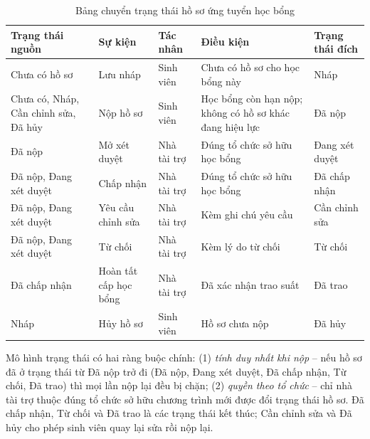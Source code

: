 \begin{table}[H]
    \centering
    \footnotesize
    \renewcommand{\arraystretch}{1.3}
    \setlength{\tabcolsep}{4pt}
    \begin{tabular}{|>{\raggedright\arraybackslash}p{3.2cm}|>{\raggedright\arraybackslash}p{2.0cm}|>{\raggedright\arraybackslash}p{1.5cm}|>{\raggedright\arraybackslash}p{3.2cm}|>{\raggedright\arraybackslash}p{2.4cm}|}
        \hline
        \textbf{Trạng thái nguồn} & \textbf{Sự kiện} & \textbf{Tác nhân} & \textbf{Điều kiện} & \textbf{Trạng thái đích} \\
        \hline
        Chưa có hồ sơ & Lưu nháp & Sinh viên & Chưa có hồ sơ cho học bổng này & Nháp \\
        \hline
        Chưa có, Nháp, Cần chỉnh sửa, Đã hủy & Nộp hồ sơ & Sinh viên & Học bổng còn hạn nộp; không có hồ sơ khác đang hiệu lực & Đã nộp \\
        \hline
        Đã nộp & Mở xét duyệt & Nhà tài trợ & Đúng tổ chức sở hữu học bổng & Đang xét duyệt \\
        \hline
        Đã nộp, Đang xét duyệt & Chấp nhận & Nhà tài trợ & Đúng tổ chức sở hữu học bổng & Đã chấp nhận \\
        \hline
        Đã nộp, Đang xét duyệt & Yêu cầu chỉnh sửa & Nhà tài trợ & Kèm ghi chú yêu cầu & Cần chỉnh sửa \\
        \hline
        Đã nộp, Đang xét duyệt & Từ chối & Nhà tài trợ & Kèm lý do từ chối & Từ chối \\
        \hline
        Đã chấp nhận & Hoàn tất cấp học bổng & Nhà tài trợ & Đã xác nhận trao suất & Đã trao \\
        \hline
        Nháp & Hủy hồ sơ & Sinh viên & Hồ sơ chưa nộp & Đã hủy \\
        \hline
    \end{tabular}

    \caption{Bảng chuyển trạng thái hồ sơ ứng tuyển học bổng}
    \label{tab:scholarship-state}
\end{table}

Mô hình trạng thái có hai ràng buộc chính: (1) \textit{tính duy nhất khi nộp} -- nếu hồ sơ đã ở trạng thái từ Đã nộp trở đi (Đã nộp, Đang xét duyệt, Đã chấp nhận, Từ chối, Đã trao) thì mọi lần nộp lại đều bị chặn; (2) \textit{quyền theo tổ chức} -- chỉ nhà tài trợ thuộc đúng tổ chức sở hữu chương trình mới được đổi trạng thái hồ sơ. Đã chấp nhận, Từ chối và Đã trao là các trạng thái kết thúc; Cần chỉnh sửa và Đã hủy cho phép sinh viên quay lại sửa rồi nộp lại.

